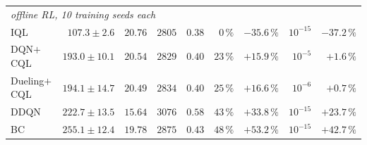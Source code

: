 \begin{table}[t]
\begin{tabular}{lrrrrrrrr}
\midrule
\multicolumn{9}{l}{\emph{offline RL, 10 training seeds each}} \\
\quad IQL & $107.3 \pm 2.6$ & $20.76$ & $2805$ & $0.38$ & $0\,\%$ & $-35.6\,\%$ & $10^{-15}$ & $-37.2\,\%$ \\
\quad DQN$+$CQL & $193.0 \pm 10.1$ & $20.54$ & $2829$ & $0.40$ & $23\,\%$ & $+15.9\,\%$ & $10^{-5}$ & $+1.6\,\%$ \\
\quad Dueling$+$CQL & $194.1 \pm 14.7$ & $20.49$ & $2834$ & $0.40$ & $25\,\%$ & $+16.6\,\%$ & $10^{-6}$ & $+0.7\,\%$ \\
\quad DDQN & $222.7 \pm 13.5$ & $15.64$ & $3076$ & $0.58$ & $43\,\%$ & $+33.8\,\%$ & $10^{-15}$ & $+23.7\,\%$ \\
\quad BC & $255.1 \pm 12.4$ & $19.78$ & $2875$ & $0.43$ & $48\,\%$ & $+53.2\,\%$ & $10^{-15}$ & $+42.7\,\%$ \\
\bottomrule
\end{tabular}
\end{table}
